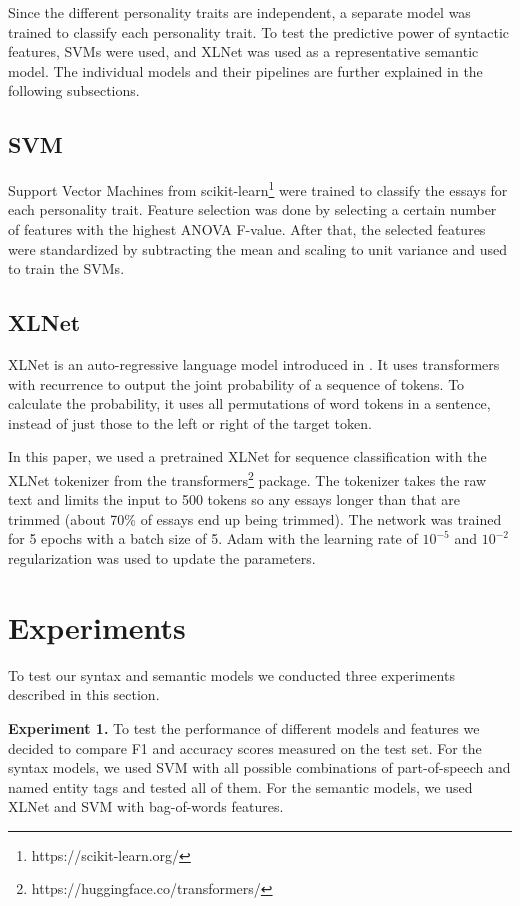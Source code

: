 \documentclass[10pt, a4paper]{article}
\begin{document}
Since the different personality traits are independent, a separate model was trained to classify each personality trait.
To test the predictive power of syntactic features, SVMs were used, and XLNet was used as a representative semantic model.
The individual models and their pipelines are further explained in the following subsections.

\subsection{SVM}

Support Vector Machines from scikit-learn\footnote{https://scikit-learn.org/} were trained to classify the essays for each personality trait.
Feature selection was done by selecting a certain number of features with the highest ANOVA F-value.
After that, the selected features were standardized by subtracting the mean and scaling to unit variance and used to train the SVMs.

\subsection{XLNet}

XLNet is an auto-regressive language model introduced in \citep{DBLP:journals/corr/abs-1906-08237}.
It uses transformers with recurrence to output the joint probability of a sequence of tokens.
To calculate the probability, it uses all permutations of word tokens in a sentence, instead of just those to the left or right of the target token.

In this paper, we used a pretrained XLNet for sequence classification with the XLNet tokenizer from the transformers\footnote{https://huggingface.co/transformers/} package.
The tokenizer takes the raw text and limits the input to 500 tokens so any essays longer than that are trimmed (about 70\% of essays end up being trimmed).
The network was trained for 5 epochs with a batch size of 5.
Adam with the learning rate of $10^{-5}$ and $10^{-2}$ regularization was used to update the parameters.

\section{Experiments}
To test our syntax and semantic models we conducted three experiments described in this section.

\textbf{Experiment 1.} To test the performance of different models and features we decided to compare F1 and accuracy scores measured on the test set.
For the syntax models, we used SVM with all possible combinations of part-of-speech and named entity tags and tested all of them.
For the semantic models, we used XLNet and SVM with bag-of-words features.
\end{document}
